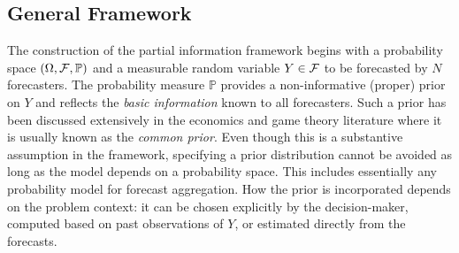 \documentclass[11pt]{article}
\renewcommand{\P}{\mathbb{P}}
\theoremstyle{definition}
\theoremstyle{definition}
\def\F{{\cal F}}
\def\P{{\mathbb P}}
\begin{document}





\subsection{General Framework}



The construction  of the partial information framework begins with
 a probability space $(\Omega, \F , \P)$ and a
measurable random variable $Y \in \F$ to be forecasted by $N$ forecasters. The probability measure $\P$ provides a non-informative (proper) prior on $Y$ and  reflects the \textit{basic information} known to all forecasters. 
Such a prior has been discussed extensively in the economics and game theory literature where it is usually known as the \textit{common prior}. 
Even though this is a substantive assumption in the framework, specifying a prior distribution cannot be avoided as
long as the model depends on a probability space. This includes essentially any probability
model for forecast aggregation. How the prior is incorporated depends on the problem context: it can be chosen explicitly by the decision-maker, computed based on past observations of $Y$, or estimated directly from the forecasts. 
\end{document}
